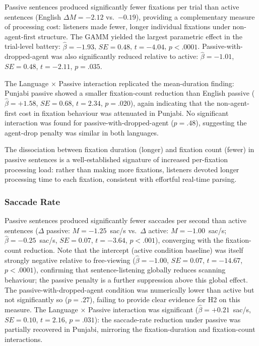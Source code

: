 \documentclass[12pt, a4paper]{article}
\begin{document}
Passive sentences produced significantly fewer fixations per trial than
active sentences (English $\Delta M = -2.12$ vs.\ $-0.19$), providing a
complementary measure of processing cost: listeners made fewer, longer
individual fixations under non-agent-first structure.
The GAMM yielded the largest parametric effect in the trial-level battery:
$\hat{\beta} = -1.93$, $SE = 0.48$, $t = -4.04$, $p < .0001$.
Passive-with-dropped-agent was also significantly reduced relative to active:
$\hat{\beta} = -1.01$, $SE = 0.48$, $t = -2.11$, $p = .035$.

The Language $\times$ Passive interaction replicated the mean-duration finding:
Punjabi passive showed a smaller fixation-count reduction than English passive
($\hat{\beta} = +1.58$, $SE = 0.68$, $t = 2.34$, $p = .020$), again indicating
that the non-agent-first cost in fixation behaviour was attenuated in Punjabi.
No significant interaction was found for passive-with-dropped-agent
($p = .48$), suggesting the agent-drop penalty was similar in both languages.

The dissociation between fixation duration (longer) and fixation count
(fewer) in passive sentences is a well-established signature of
increased per-fixation processing load: rather than making more fixations,
listeners devoted longer processing time to each fixation, consistent with
effortful real-time parsing.

\subsubsection{Saccade Rate}

Passive sentences produced significantly fewer saccades per second than
active sentences ($\Delta$ passive: $M = -1.25$~sac/s vs.\ $\Delta$ active:
$M = -1.00$~sac/s; $\hat{\beta} = -0.25$~sac/s, $SE = 0.07$, $t = -3.64$,
$p < .001$), converging with the fixation-count reduction.
Note that the intercept (active condition baseline) was itself strongly
negative relative to free-viewing ($\hat{\beta} = -1.00$, $SE = 0.07$,
$t = -14.67$, $p < .0001$), confirming that sentence-listening globally
reduces scanning behaviour; the passive penalty is a further suppression
above this global effect.
The passive-with-dropped-agent condition was numerically lower than active
but not significantly so ($p = .27$), failing to provide clear evidence
for H2 on this measure.
The Language $\times$ Passive interaction was significant
($\hat{\beta} = +0.21$~sac/s, $SE = 0.10$, $t = 2.16$, $p = .031$):
the saccade-rate reduction under passive was partially recovered in Punjabi,
mirroring the fixation-duration and fixation-count interactions.
\end{document}

